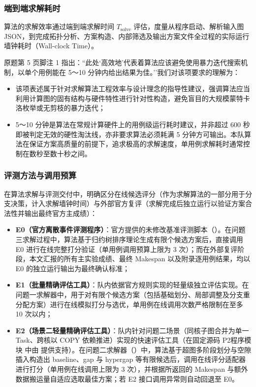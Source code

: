\documentclass[anonymous,withtoc]{gmcm2026}
\providecommand{\tightlist}{\setlength{\itemsep}{0pt}\setlength{\parskip}{0pt}}
\begin{document}
\subsubsection{端到端求解耗时}

算法的求解效率通过端到端求解时间 \(T_{\text{solve}}\) 评估，度量从程序启动、解析输入图 JSON，到完成拓扑分析、方案构造、内部筛选及输出方案文件全过程的实际运行墙钟耗时（Wall-clock Time）。

原题第 5 页脚注 1 指出：``此处`高效地'代表着算法应该避免使用暴力迭代搜索机制，以单个用例能在 5～10 分钟内给出结果为佳。''我们对该项要求的理解为：

\begin{itemize}
\tightlist
\item
  该项表述属于针对求解算法工程效率与设计理念的指导性建议，强调算法应当利用计算图的固有结构与硬件特性进行针对性构造，避免盲目的大规模蒙特卡洛枚举或无剪枝的暴力迭代；
\item
  5～10 分钟是算法在常规计算硬件上的用例级运行耗时建议，并非超过 600 秒即被判定无效的硬性淘汰线，亦非要求算法必须耗满 5 分钟方可输出。本队算法在保证方案高质量的前提下，追求极高的求解速度，单用例求解耗时通常控制在数秒至数十秒之间。
\end{itemize}

\subsubsection{评测方法与调用预算}

在算法求解与评测交付中，明确区分在线候选评分（作为求解算法的一部分用于分支决策，计入求解墙钟时间）与外部官方复评（求解完成后独立运行以验证方案合法性并输出最终官方主成绩）：

\begin{itemize}
\tightlist
\item
  \textbf{E0（官方离散事件评测程序）}：官方提供的未修改基准评测脚本（\texttt{}）。在问题三求解过程中，算法基于归约树排序理论生成有限个候选方案后，直接调用 E0 进行在线完整打分验证（单用例调用预算上限为 3 次）；而在外部复评阶段，本文汇报的所有主实验成绩、最终 Makespan 以及附录逐用例结果，均以 E0 的独立运行输出为最终确认标准；
\item
  \textbf{E1（批量精确评估工具）}：队内依据官方规则实现的轻量级独立评估实现。在问题一求解器中，用于对有限个候选方案（包括基础划分、局部调整及分支重分配方案）进行在线模拟打分与选优，单用例在线调用次数严格限制在至多 10 次以内；
\item
  \textbf{E2（场景二轻量精确评估工具）}：队内针对问题二场景（同核子图合并为单一 Task、跨核以 COPY 依赖推进）实现的快速评估工具（在固定源码 P2程序模块 中由 \texttt{} 提供支持）。在问题二求解器（\texttt{}）中，算法基于超图多阶段划分与空隙插入构造出 baseline、gap 与 hypergap 等有限候选后，调用在线评分适配器进行打分（单用例在线调用上限为 3 次），并根据所返回的 Makespan 与额外数据搬运量自适应选取最佳方案；若 E2 接口调用异常则自动回退至 E0。
\end{itemize}
\end{document}
